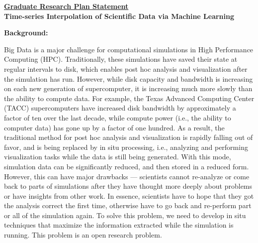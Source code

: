 \documentclass[12pt]{article}
\begin{document}
\begin{center}
\underline{\bf Graduate Research Plan Statement}\\
{\bf Time-series Interpolation of Scientific Data via Machine Learning} \\
\end{center}


\textbf{Background:}
%

Big Data is a major challenge for computational simulations 
in High Performance Computing (HPC).
%
Traditionally, these simulations have saved their state at
regular intervals to disk, which enables post hoc analysis
and visualization after the simulation has run.
%
However, while disk capacity and bandwidth is increasing on each
new generation of supercomputer, it is increasing much more slowly
than the ability to compute data.
%
For example, the Texas Advanced Computing Center (TACC) supercomputers
have increased disk bandwidth by approximately a factor of ten over
the last decade, while compute power (i.e., the ability to computer
data) has gone up by a factor of one hundred.
%
%
As a result, the traditional method for post hoc analysis and visualization
is rapidly falling out of favor, and is being replaced by in situ processing,
i.e., analyzing and performing
visualization tasks while the data is still being generated. 
%
With this mode, simulation data can be significantly reduced, and then
stored in a reduced form.
However, this can have major
drawbacks --- scientists cannot re-analyze or come back to parts of
simulations after they have thought more deeply about problems or have insights
from other work. 
%
In essence, scientists have to hope that they got the analysis
correct the first time, otherwise have to go back and re-perform part or all of
the simulation again. 
%
To solve this problem, we need to develop in situ techniques that maximize the information 
extracted while the simulation is running.
%
This problem is an open research problem.

\end{document}
